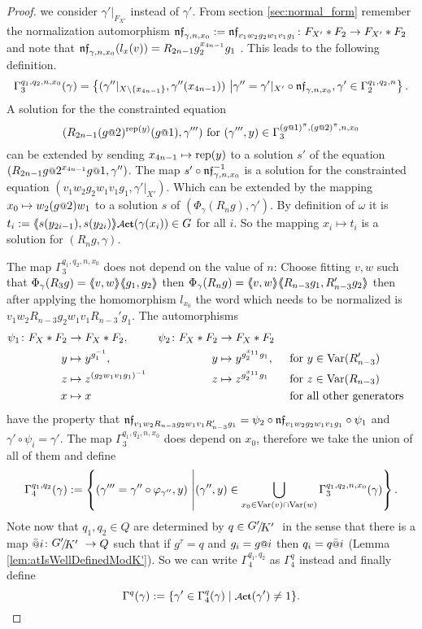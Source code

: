 \documentclass[a4paper,12pt]{article}
\begin{document}
\begin{proof}
 we consider $\gamma'|_{F_{X'}}$ instead of $\gamma'$.
 From section \ref{sec:normal_form} remember the normalization 
 automorphism $\mathfrak{nf}_{\gamma,n,x_0}:=\mathfrak{nf}_{v_1w_2g_2w_1v_1g_1}\colon F_{X'}*F_2 \to F_{X'}*F_2$
  and note that
 $\mathfrak{nf}_{\gamma,n,x_0}(l_x(v))=R_{2n-1}g_2^{x_{4n-1}}g_1$ .
 This leads to the following definition.
 \[\Gamma_3^{q_1,q_2,n,x_0}(\gamma) = \left\{(\gamma''|_{X\setminus\{x_{4n-1}\}},\gamma''(x_{4n-1})) \ \middle \vert
 \gamma''= \gamma'|_{X'} \circ \mathfrak{nf}_{\gamma,n,x_0},\gamma' \in \Gamma_2^{q_1,q_2,n} \right\}.\] 
 A solution for the the constrainted equation
 \[(R_{2n-1}(g\at2)^{\textup{rep}(y)}(g\at1),\gamma''')\textup{ for }(\gamma''',y) \in \Gamma_3^{(g\at{1})^\pi,(g\at{2})^\pi,n,x_0}\]
 can be 
 extended by sending $x_{4n-1}\mapsto \textup{rep}(y)$ to a solution $s'$ 
 of the equation $(R_{2n-1} g\at{2}^{x_{4n-1}} g\at{1},\gamma'')$. The map $s'\circ \mathfrak{nf}_{\gamma,n,x_0}^{-1}$ 
 is a solution for the constrainted equation $(v_1w_2g_2w_1v_1g_1,\gamma'|_{X'})$. Which can be extended by the mapping $x_0\mapsto w_2(g\at{2})w_1$ to a solution $s$ of $(\Phi_\gamma(R_n g),\gamma')$.
 By definition of $\omega$ it is $t_i:=\pair{s(y_{2i-1}),s(y_{2i})}\act(\gamma(x_i)) \in G$ for all $i$. So the mapping $x_i\mapsto t_i$ is a solution for $(R_ng,\gamma)$.
 
 The map $\Gamma_3^{q_1,q_2,n,x_0}$ does not depend on the value of $n$: 
 Choose fitting $v,w$ such that $\Phi_\gamma(R_3g)=\langle\negthickspace\langle v,w\rangle\negthickspace\rangle\langle\negthickspace\langle g_1,g_2\rangle\negthickspace\rangle$ then $\Phi_\gamma(R_ng)=\langle\negthickspace\langle v,w\rangle\negthickspace\rangle\langle\negthickspace\langle R_{n-3}g_1,R_{n-3}'g_2\rangle\negthickspace\rangle$ 
 then after applying the homomorphism $l_{x_0}$ 
 the word which needs to be normalized is $v_1w_2R_{n-3}g_2w_1v_1R_{n-3}'g_1$. The automorphisms
 \begin{align*}
 \psi_1 \colon F_X*F_2 &\to F_X*F_2, & \psi_2 \colon F_X*F_2 &\to F_X*F_2\\
 y &\mapsto y^{g_1^{-1}}, & y &\mapsto y^{g_2^{x_{11}}g_1}, & &\text{ for }y\in \textup{Var}(R_{n-3}')\\
 z &\mapsto z^{(g_2w_1v_1g_1)^{-1}}& z &\mapsto z^{g_2^{x_{11}}g_1}  & &\text{ for }z\in \textup{Var}(R_{n-3})\\
 x &\mapsto x & & & &\text{ for all other generators}
 \end{align*}
 have the property that $\mathfrak{nf}_{v_1w_2R_{n-3}g_2w_1v_1R_{n-3}'g_1} = \psi_2\circ\mathfrak{nf}_{v_1w_2g_2w_1v_1g_1}\circ \psi_1$ and 
 $\gamma' \circ \psi_i = \gamma'$.
 The map $\Gamma_3^{q_1,q_2,n,x_0}$ does depend on $x_0$, therefore we take the union of all of them and define
  \[\Gamma_4^{q_1,q_2}(\gamma) := 
  \left\{(\gamma''' = \gamma''\circ \varphi_{\gamma''},y) \ \middle \vert 
  (\gamma'',y) \in \bigcup_{x_0\in \textup{Var}(v)\cap\textup{Var}(w)}\Gamma_3^{q_1,q_2,n,x_0}(\gamma)\right\}.\]
 Note now that $q_{1},q_2\in Q$ are determined by $q\in\RNK{G'}{K'}$ in the sense that there is a map $\att{i}\colon \RNK{G'}{K'}\to Q$ such that if $g^\tau = q$ and $g_i=g\at{i}$ 
 then $q_i = q\att{i}$ (Lemma \ref{lem:atIsWellDefinedModK'}). So we can write $\Gamma_4^{q_1,q_2}$ as $\Gamma_4^q$ instead and finally define
 \[\Gamma^q(\gamma) := \{\gamma' \in \Gamma_4^q(\gamma) \mid \act(\gamma')\neq 1 \}.\]
 

\end{proof}
\end{document}
